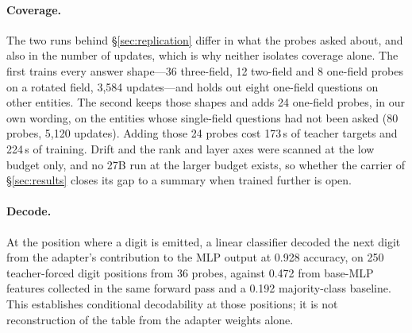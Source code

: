 \documentclass[sigconf,nonacm]{acmart}
\begin{document}
\paragraph{Coverage.} The two runs behind \S\ref{sec:replication} differ in what the probes asked about, and also in
the number of updates, which is why neither isolates coverage alone. The first trains every answer shape---36
three-field, 12 two-field and 8 one-field probes on a rotated field, 3{,}584 updates---and holds out eight
one-field questions on other entities. The second keeps those shapes and adds 24 one-field probes, in our own
wording, on the entities whose single-field questions had not been asked (80 probes, 5{,}120 updates). Adding
those 24 probes cost 173\,s of teacher targets and 224\,s of training. Drift and the rank and layer axes were scanned at the low
budget only, and no 27B run at the larger budget exists, so whether the carrier of \S\ref{sec:results} closes its
gap to a summary when trained further is open.

\paragraph{Decode.} At the position where a digit is emitted, a linear classifier decoded the next digit from the
adapter's contribution to the MLP output at 0.928 accuracy, on 250 teacher-forced digit positions from 36 probes,
against 0.472 from base-MLP features collected in the same forward pass and a 0.192 majority-class baseline. This
establishes conditional decodability at those positions; it is not reconstruction of the table from the adapter
weights alone.



\end{document}
